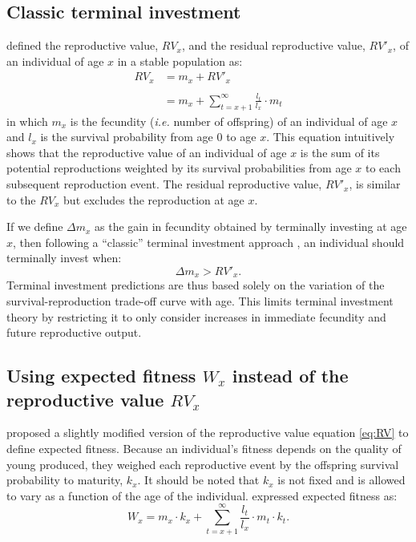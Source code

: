 \documentclass[12pt,review,authoryear]{elsarticle}
\begin{document}
\subsection{Classic terminal investment}
\cite{Williams_Natural_1966} defined the reproductive value, $RV_{x}$, and the residual reproductive value, $RV'_{x}$, of an individual of age $x$ in a stable population as:
\begin{equation}\label{eq:RV}
\begin{split} 
RV_x& = m_x + RV'_{x} \\ \\
& = m_x + \sum_{t= x + 1}^{\infty} \frac{l_t}{l_x} \cdot m_t
\end{split}
\end{equation}
in which $m_x$ is the fecundity (\textit{i.e.} number of offspring) of an individual of age $x$ and $l_x$ is the survival probability from age 0 to age $x$. This equation intuitively shows that the reproductive value of an individual of age $x$ is the sum of its potential reproductions weighted by its survival probabilities from age $x$ to each subsequent reproduction event. The residual reproductive value, $RV'_{x}$, is similar to the $RV_{x}$ but excludes the reproduction at age $x$.

If we define $\Delta m_{x}$ as the gain in fecundity obtained by terminally investing at age $x$, then following a ``classic'' terminal investment approach \citep{Pianka_Agespecific_1975,Williams_Natural_1966}, an individual should terminally invest when:
\begin{equation}\label{eq:tic}
\Delta m_{x} > RV'_{x}.
\end{equation}
Terminal investment predictions are thus based solely on the variation of the survival-reproduction trade-off curve with age. This limits terminal investment theory by restricting it to only consider increases in immediate fecundity and future reproductive output.

\subsection{Using expected fitness $W_{x}$ instead of the reproductive value $RV_x$}
\cite{Hirshfield_Natural_1975} proposed a slightly modified version of the reproductive value equation \eqref{eq:RV} to define expected fitness. Because an individual's fitness depends on the quality of young produced, they weighed each reproductive event by the offspring survival probability to maturity, $k_x$. It should be noted that $k_x$ is not fixed and is allowed to vary as a function of the age of the individual. 
\cite{Hirshfield_Natural_1975} expressed expected fitness as:
\begin{equation}\label{eq:wx}
W_{x} = m_x \cdot k_x + \sum_{t= x + 1}^{\infty} \frac{l_t}{l_x} \cdot m_t \cdot k_t.
\end{equation}
\end{document}
